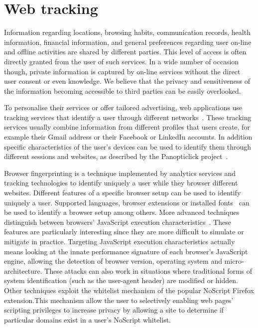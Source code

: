 \section{Web tracking}

Information regarding locations, browsing habits, communication records, health information, financial information, and general preferences regarding user on-line and offline activities are shared by different parties. This level of access is often directly granted from the user of such services. In a wide number of occasion though, private information is captured by on-line services without the direct user consent or even knowledge. We believe that the privacy and sensitiveness of the information becoming accessible to third parties can be easily overlooked. 

To personalise their services or offer tailored advertising, web applications use tracking services that identify a user through different networks~\cite{veeningen2014line,getoor2012entity}. These tracking services usually combine information from different profiles that users create, for example their Gmail address or their Facebook or LinkedIn accounts. In addition specific characteristics of the user's devices can be used to identify them through different sessions and websites, as described by the Panopticlick project~\cite{eckersley2010unique}.

Browser fingerprinting is a technique implemented by analytics services and tracking technologies to identify uniquely a user while they browser different websites. Different features of a specific browser setup can be used to identify uniquely a user. Supported languages, browser extensions or installed fonts~\cite{boda2012user} can be used to identify a browser setup among others. More advanced techniques distinguish between browsers' JavaScript execution characteristics~\cite{mowery2011fingerprinting}. These features are particularly interesting since they are more difficult to simulate or mitigate in practice. Targeting JavaScript execution characteristics actually means looking at the innate performance signature of each browser's JavaScript engine, allowing the detection of browser version, operating system and micro-architecture. These attacks can also work in situations where traditional forms of system identification (such as the user-agent header) are modified or hidden. Other techniques exploit the whitelist mechanism of the popular NoScript Firefox extension.This mechanism allow the user to selectively enabling web pages' scripting privileges to increase privacy by allowing a site to determine if particular domains exist in a user's NoScript whitelist.

